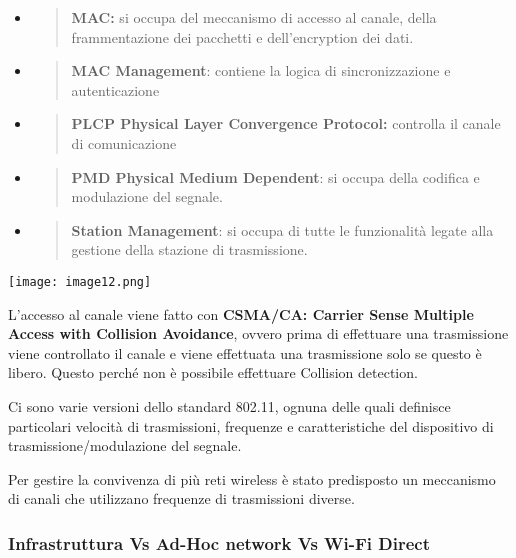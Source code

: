 \begin{itemize}
\item
  \begin{quote}
  \textbf{MAC:} si occupa del meccanismo di accesso al canale, della
  frammentazione dei pacchetti e dell'encryption dei dati.
  \end{quote}
\item
  \begin{quote}
  \textbf{MAC Management}: contiene la logica di sincronizzazione e
  autenticazione
  \end{quote}
\item
  \begin{quote}
  \textbf{PLCP Physical Layer Convergence Protocol:} controlla il canale
  di comunicazione
  \end{quote}
\item
  \begin{quote}
  \textbf{PMD Physical Medium Dependent}: si occupa della codifica e
  modulazione del segnale.
  \end{quote}
\item
  \begin{quote}
  \textbf{Station Management}: si occupa di tutte le funzionalità legate
  alla gestione della stazione di trasmissione.
  \end{quote}
\end{itemize}

\texttt{[image: image12.png]}

L'accesso al canale viene fatto con \textbf{CSMA/CA: Carrier Sense
Multiple Access with Collision Avoidance}, ovvero prima di effettuare
una trasmissione viene controllato il canale e viene effettuata una
trasmissione solo se questo è libero. Questo perché non è possibile
effettuare Collision detection.

Ci sono varie versioni dello standard 802.11, ognuna delle quali
definisce particolari velocità di trasmissioni, frequenze e
caratteristiche del dispositivo di trasmissione/modulazione del segnale.

Per gestire la convivenza di più reti wireless è stato predisposto un
meccanismo di canali che utilizzano frequenze di trasmissioni diverse.

\subsubsection{Infrastruttura Vs Ad-Hoc network Vs Wi-Fi
Direct}\label{infrastruttura-vs-ad-hoc-network-vs-wi-fi-direct}

